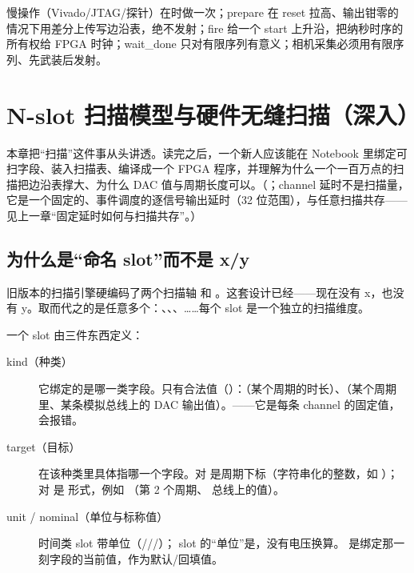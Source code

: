 \documentclass[11pt,oneside,openany]{book}
\begin{document}
\begin{notebox}[一句话记住整章]
慢操作（Vivado/JTAG/探针）在时做一次；prepare 在 reset 拉高、输出钳零的情况下用差分上传写边沿表，绝不发射；fire 给一个 start 上升沿，把纳秒时序的所有权给 FPGA 时钟；wait\_done 只对有限序列有意义；相机采集必须用有限序列、先武装后发射。
\end{notebox}

\chapter{N-slot 扫描模型与硬件无缝扫描（深入）}

本章把“扫描”这件事从头讲透。读完之后，一个新人应该能在 Notebook 里绑定可扫字段、装入扫描表、编译成一个 FPGA 程序，并理解为什么一个一百万点的扫描把边沿表撑大、为什么 DAC 值与周期长度可以。（；channel 延时不是扫描量，它是一个固定的、事件调度的逐信号输出延时（32 位范围），与任意扫描共存——见上一章“固定延时如何与扫描共存”。）

\section{为什么是“命名 slot”而不是 x/y}

旧版本的扫描引擎硬编码了两个扫描轴  和 。这套设计已经——现在没有 x，也没有 y。取而代之的是任意多个：、、、……每个 slot 是一个独立的扫描维度。

一个 slot 由三件东西定义：

\begin{description}
\item[kind（种类）] 它绑定的是哪一类字段。只有合法值（）：（某个周期的时长）、（某个周期里、某条模拟总线上的 DAC 输出值）。——它是每条 channel 的固定值， 会报错。
\item[target（目标）] 在该种类里具体指哪一个字段。对  是周期下标（字符串化的整数，如 ）；对  是  形式，例如 （第 2 个周期、 总线上的值）。
\item[unit / nominal（单位与标称值）] 时间类 slot 带单位（///）； slot 的“单位”是，没有电压换算。 是绑定那一刻字段的当前值，作为默认/回填值。
\end{description}
\end{document}
